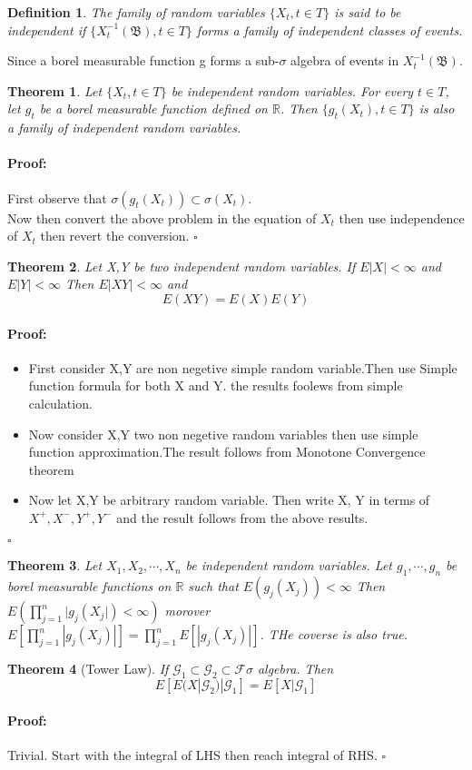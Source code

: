 \documentclass{article}
\newenvironment{proof}{\paragraph{Proof:}}{\hfill$\square$}
\newtheorem{definition}{Definition}[section]
\newtheorem{theorem}{Theorem}[section]
\begin{document}
\begin{definition}
    The family of random variables $\{ X_t,t \in T\}$ is said to be independent if $\{ X^{-1}_t (\mathfrak{B} ), t \in T\}$ forms a family of independent classes of events.
\end{definition}
Since a borel measurable function g forms a sub-$\sigma$ algebra of events in $X^{-1}_t(\mathfrak{B}) $.
\begin{theorem}
    Let $\{ X_t,t \in T  \}$ be independent random variables. For every $t \in T$, let $g_t$ be a borel measurable function defined on $\mathbb{R} $. Then $\{ g_t(X_t) , t \in T\}$ is also a family of independent random variables.

\end{theorem}
\begin{proof}
    First observe that $\sigma(g_t(X_t)) \subset \sigma (X_t)$. \\
    Now then convert the above problem in the equation of $X_t$ then use independence of $X_t$ then revert the conversion.  
\end{proof}
\begin{theorem}
Let X,Y be two independent random variables. If $E|X|< \infty$ and $E|Y|<\infty$ Then $E|XY|< \infty$ and \[E(XY) = E(X)E(Y) \]
\end{theorem}
\begin{proof}
    \begin{itemize}
        \item     First consider X,Y are non negetive simple random variable.Then use Simple function formula for both X and Y. the results foolews from simple calculation. 
        \item Now consider X,Y two non negetive random variables then use simple function approximation.The result follows from Monotone Convergence theorem 
        \item Now let X,Y be arbitrary random variable. Then write X, Y in terms of $X^+ ,X^-,Y^+,Y^- $ and the result follows from the above results. 
    \end{itemize}
\end{proof}
\begin{theorem}
    Let $X_1,X_2,\cdots, X_n$ be independent random variables. Let $g_1, \cdots,g_n$ be borel measurable functions on $\mathbb{R}$ such that $E(g_j(X_j)) < \infty$ Then $E(\prod_{j=1}^{n}|g_j(X_j|) < \infty  )$ morover $E[\prod_{j=1}^{n}|g_j(X_j)|] = \prod_{j=1}^{n}E[|g_j(X_j)|]$. THe coverse is also true.    
\end{theorem}
\begin{theorem}[Tower Law]
    If $\mathcal{G}_1 \subset \mathcal{G}_2 \subset \mathcal{F}  \sigma $ algebra. Then \[ E[E(X|\mathcal{G}_2 )|\mathcal{G} _1] = E[X|\mathcal{G} _1] \] 
\end{theorem}
\begin{proof}
    Trivial. Start with the integral of LHS then reach integral of RHS.
\end{proof}
\end{document}
